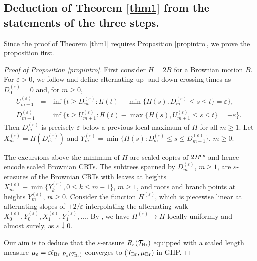 \documentclass[11pt,a4paper]{article}
\newcommand{\cT}{\mathcal{T}}
\begin{document}
\subsection{Deduction of Theorem \ref{thm1} from the statements of the three steps.}\label{secpfthm}

Since the proof of Theorem \ref{thm1} requires Proposition \ref{propintro}, we prove the proposition first.

\begin{proof}[Proof of Proposition \ref{propintro}] First consider $H=2B$ for a Brownian motion $B$. For $\varepsilon>0$, we follow 
  \cite[Section 7.6]{csp} and define alternating up- and down-crossing times as $D_0^{(\varepsilon)}=0$ and, for $m\ge 0$, 
  \begin{eqnarray*}U_{m+1}^{(\varepsilon)}&=&\inf\{t\ge D_m^{(\varepsilon)}\colon H(t)-\min\{H(s),D_m^{(\varepsilon)}\le s\le t\}=\varepsilon\},\\
                D_{m+1}^{(\varepsilon)}&=&\inf\{t\ge U_{m+1}^{(\varepsilon)}\colon H(t)-\max\{H(s),U_{m+1}^{(\varepsilon)}\le s\le t\}=-\varepsilon\}.
  \end{eqnarray*}
  Then $D_m^{(\varepsilon)}$ is precisely $\varepsilon$ below a previous local maximum of $H$ for all $m\ge 1$. Let 
  $X_m^{(\varepsilon)}=H(D_m^{(\varepsilon)})$ and $Y_m^{(\varepsilon)}=\min\{H(s)\colon D_{m}^{(\varepsilon)}\le s\le D_{m+1}^{(\varepsilon)}\}$, $m\ge 0$. 
  
  The excursions above the minimum of $H$ are scaled copies of $2B^{\rm ex}$ and hence encode scaled Brownian CRTs. The subtrees spanned by 
  $D_m^{(\varepsilon)}$, $m\ge 1$, are $\varepsilon$-erasures of the Brownian CRTs with leaves at heights $X_m^{(\varepsilon)}-\min\{Y_k^{(\varepsilon)},0\le k\le m-1\}$,
  $m\ge 1$, and roots and branch points at heights $Y_m^{(\varepsilon)}$, $m\ge 0$. Consider the function $H^{(\varepsilon)}$, which is piecewise linear at alternating
  slopes of $\pm 2/\varepsilon$ interpolating the alternating walk $X_0^{(\varepsilon)},Y_0^{(\varepsilon)},X_1^{(\varepsilon)},Y_1^{(\varepsilon)},\ldots$. By 
  \cite[Corollary 7.17]{csp}, we have $H^{(\varepsilon)}\rightarrow H$ locally uniformly and almost surely, as $\varepsilon\downarrow 0$.

  Our aim is to deduce that the $\varepsilon$-erasure $R_\varepsilon(\cT_{\rm Br})$ equipped with a scaled length measure 
  $\mu_\varepsilon=\varepsilon\ell_{\rm Br}|_{R_\varepsilon(\cT_{\rm Br})}$ converges to $(\cT_{\rm Br},\mu_{\rm Br})$ in GHP.


\end{proof}
\end{document}
